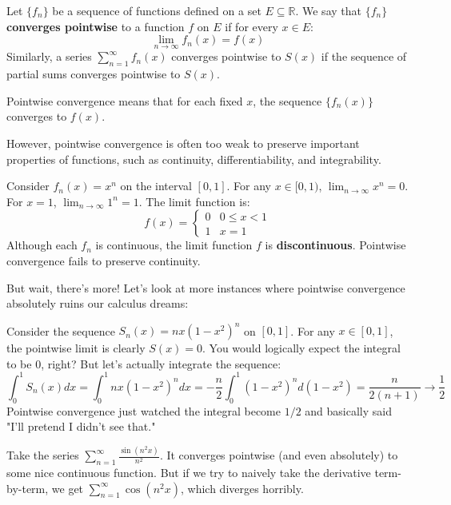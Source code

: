 \begin{definition}
Let $\{f_n\}$ be a sequence of functions defined on a set $E \subseteq \mathbb{R}$. We say that $\{f_n\}$ \textbf{converges pointwise} to a function $f$ on $E$ if for every $x \in E$:
\[ \lim_{n \to \infty} f_n(x) = f(x) \]
Similarly, a series $\sum_{n=1}^{\infty} f_n(x)$ converges pointwise to $S(x)$ if the sequence of partial sums converges pointwise to $S(x)$.
\end{definition}

Pointwise convergence means that for each fixed $x$, the sequence $\{f_n(x)\}$ converges to $f(x)$.

However, pointwise convergence is often too weak to preserve important properties of functions, such as continuity, differentiability, and integrability.

\begin{example}
Consider $f_n(x) = x^n$ on the interval $[0, 1]$.
For any $x \in [0, 1)$, $\lim_{n \to \infty} x^n = 0$. For $x = 1$, $\lim_{n \to \infty} 1^n = 1$.
The limit function is:
\[ f(x) = \begin{cases} 0 & 0 \le x < 1 \\ 1 & x = 1 \end{cases} \]
Although each $f_n$ is continuous, the limit function $f$ is \textbf{discontinuous}. Pointwise convergence fails to preserve continuity.
\end{example}

But wait, there's more! Let's look at more instances where pointwise convergence absolutely ruins our calculus dreams:

\begin{example}
Consider the sequence $S_n(x) = nx(1-x^2)^n$ on $[0,1]$.
For any $x \in [0, 1]$, the pointwise limit is clearly $S(x) = 0$. You would logically expect the integral to be $0$, right? But let's actually integrate the sequence:
\[ \int _0^1 S_n(x) dx = \int_0^1 nx(1-x^2)^n dx = -\frac{n}{2} \int_0^1 (1-x^2)^n d(1-x^2) = \frac{n}{2(n+1)} \to \frac{1}{2} \]
Pointwise convergence just watched the integral become $1/2$ and basically said "I'll pretend I didn't see that."
\end{example}

\begin{example}
Take the series $\sum_{n=1}^{\infty} \frac{\sin(n^2 x)}{n^2}$. It converges pointwise (and even absolutely) to some nice continuous function. But if we try to naively take the derivative term-by-term, we get $\sum_{n=1}^{\infty} \cos(n^2 x)$, which diverges horribly. 
\end{example}

